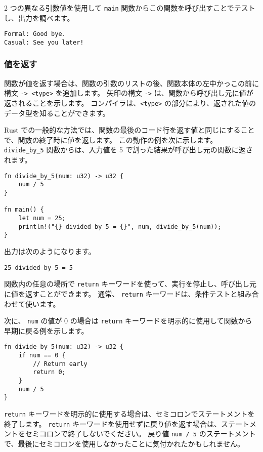 2 つの異なる引数値を使用して \texttt{main} 関数からこの関数を呼び出すことでテストし、出力を調べます。

\begin{lstlisting}[numbers=none]
Formal: Good bye.
Casual: See you later!
\end{lstlisting}

\subsubsection{値を返す}

関数が値を返す場合は、関数の引数のリストの後、関数本体の左中かっこの前に構文 \texttt{-> <type>} を追加します。 矢印の構文 \texttt{->} は、関数から呼び出し元に値が返されることを示します。 コンパイラは、\texttt{<type>} の部分により、返された値のデータ型を知ることができます。

Rust での一般的な方法では、関数の最後のコード行を返す値と同じにすることで、関数の終了時に値を返します。 この動作の例を次に示します。 \texttt{divide\_by\_5} 関数からは、入力値を 5 で割った結果が呼び出し元の関数に返されます。

\begin{lstlisting}[numbers=none]
fn divide_by_5(num: u32) -> u32 {
    num / 5
}

fn main() {
    let num = 25;
    println!("{} divided by 5 = {}", num, divide_by_5(num));
}
\end{lstlisting}

出力は次のようになります。

\begin{lstlisting}[numbers=none]
25 divided by 5 = 5
\end{lstlisting}

関数内の任意の場所で \texttt{return} キーワードを使って、実行を停止し、呼び出し元に値を返すことができます。 通常、 \texttt{return} キーワードは、条件テストと組み合わせて使います。

次に、 \texttt{num} の値が 0 の場合は \texttt{return} キーワードを明示的に使用して関数から早期に戻る例を示します。

\begin{lstlisting}[numbers=none]
fn divide_by_5(num: u32) -> u32 {
    if num == 0 {
        // Return early
        return 0;
    }
    num / 5
}
\end{lstlisting}

\texttt{return} キーワードを明示的に使用する場合は、セミコロンでステートメントを終了します。 \texttt{return} キーワードを使用せずに戻り値を返す場合は、ステートメントをセミコロンで終了しないでください。 戻り値 \texttt{num / 5} のステートメントで、最後にセミコロンを使用しなかったことに気付かれたかもしれません。

